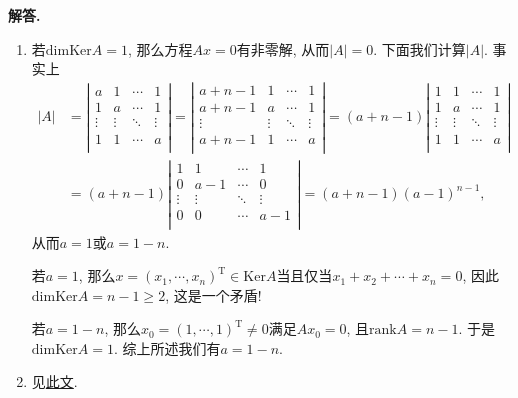 \documentclass{article}
\newenvironment{solution}{\par\noindent\textbf{解答. }}{\par}
\begin{document}
\begin{solution}
\begin{enumerate}
    \item 若$\mathrm{dim}\mathrm{Ker}A=1$, 那么方程$Ax=0$有非零解, 从而$|A|=0$. 下面我们计算$|A|$. 事实上
    $$
    \begin{aligned}
    \left| A \right|&=\left| \begin{matrix}
	a&		1&		\cdots&		1\\
	1&		a&		\cdots&		1\\
	\vdots&		\vdots&		\ddots&		\vdots\\
	1&		1&		\cdots&		a\\
    \end{matrix} \right|=\left| \begin{matrix}
	a+n-1&		1&		\cdots&		1\\
	a+n-1&		a&		\cdots&		1\\
	\vdots&		\vdots&		\ddots&		\vdots\\
	a+n-1&		1&		\cdots&		a\\
    \end{matrix} \right|=\left( a+n-1 \right) \left| \begin{matrix}
	1&		1&		\cdots&		1\\
	1&		a&		\cdots&		1\\
	\vdots&		\vdots&		\ddots&		\vdots\\
	1&		1&		\cdots&		a\\
    \end{matrix} \right|
    \\
    &=\left( a+n-1 \right) \left| \begin{matrix}
	1&		1&		\cdots&		1\\
	0&		a-1&		\cdots&		0\\
	\vdots&		\vdots&		\ddots&		\vdots\\
	0&		0&		\cdots&		a-1\\
    \end{matrix} \right|=\left( a+n-1 \right) \left( a-1 \right) ^{n-1},
    \end{aligned}
    $$
    从而$a=1$或$a=1-n$.\par
    若$a=1$, 那么$x=(x_1,\cdots,x_n)^{\mathrm{T}}\in\mathrm{Ker}A$当且仅当$x_1+x_2+\cdots+x_n=0$, 因此$\mathrm{dim}\mathrm{Ker}A=n-1\ge 2$, 这是一个矛盾!\par
    若$a=1-n$, 那么$x_0=(1,\cdots,1)^{\mathrm{T}}\ne 0$满足$Ax_0=0$, 且$\mathrm{rank}A=n-1$. 于是$\mathrm{dim}\mathrm{Ker}A=1$. 综上所述我们有$a=1-n$.
    \item 见{\href{https://hydre05236.github.io/2024/03/18/Selmer-s-Theorem-on-Irreducible-Polynomials/}{此文}}.
\end{enumerate}
\end{solution}
\newpage
\end{document}
